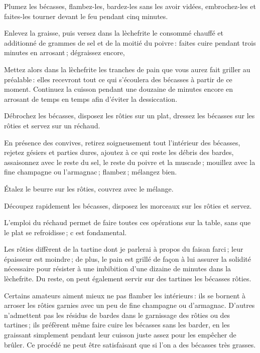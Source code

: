 Plumez les bécasses, flambez-les, bardez-les sans les avoir vidées,
embrochez-les et faites-les tourner devant le feu pendant cinq minutes.

Enlevez la graisse, puis versez dans la lèchefrite le consommé chauffé et
additionné de {\mmm} grammes de sel et de la moitié du poivre : faites cuire pendant
trois minutes en arrosant ; dégraissez encore,

Mettez alors dans la lèchefrite les tranches de pain que vous aurez fait
griller au préalable : elles recevront tout ce qui s'écoulera des bécasses
à partir de ce moment. Continuez la cuisson pendant une douzaine de minutes
encore en arrosant de temps en temps afin d'éviter la dessiccation.

Débrochez les bécasses, disposez les rôties sur un plat, dressez les bécasses
sur les rôties et servez sur un réchaud.

En présence des convives, retirez soigneusement tout l'intérieur des bécasses,
rejetez gésiers et parties dures, ajoutez à ce qui reste les débris des bardes,
assaisonnez avec le reste du sel, le reste du poivre et la muscade ; mouillez
avec la fine champagne ou l’armagnac ; flambez ; mélangez bien.

Étalez le beurre sur les rôties, couvrez avec le mélange.

Découpez rapidement les bécasses, disposez les morceaux sur les rôties et servez.

L'emploi du réchaud permet de faire toutes ces opérations sur la table, sans
que le plat se refroidisse ; c est fondamental.

Les rôties diffèrent de la tartine dont je parlerai à propos du faisan farci ;
leur épaisseur est moindre ; de plus, le pain est grillé de façon à lui assurer
la solidité nécessaire pour résister à une imbibition d'une dizaine de minutes
dans la lèchefrite. Du reste, on peut également servir sur des tartines les
bécasses rôties.

\sk

Certains amateurs aiment mieux ne pas flamber les intérieurs : ils se bornent
à arroser les rôties garnies avec un peu de fine champagne ou d'armagnac.
D'autres n'admettent pas les résidus de bardes dans le garnissage des rôties ou
des tartines ; ils préfèrent même faire cuire les bécasses sans les barder, en
les graissant simplement pendant leur cuisson juste assez pour les empêcher de
brûler. Ce procédé ne peut être satisfaisant que si l'on a des bécasses très
grasses.

\medskip

